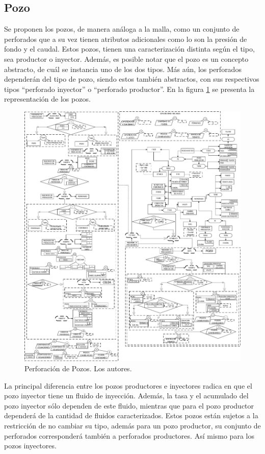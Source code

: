 \subsection{Pozo}\label{sec:PS_Well}
Se proponen los pozos, de manera análoga a la malla, como un conjunto de perforados que a su vez tienen atributos adicionales como lo son la presión de fondo y el caudal. Estos pozos, tienen una caracterización distinta según el tipo, sea productor o inyector. Además, es posible notar que el pozo es un concepto abstracto, de cuál se instancia uno de los dos tipos. Más aún, los perforados dependerán del tipo de pozo, siendo estos también abstractos, con sus respectivos tipos ``perforado inyector'' o ``perforado productor''. En la figura \ref{fig:Well} se presenta la representación de los pozos.\\

\begin{figure}[h]
	\centering%
	\includegraphics[width=0.9\linewidth]{Fig/Pozo.pdf}%
	\caption[Perforación de Pozos.]{Perforación de Pozos. Los autores.} \label{fig:Well}
\end{figure}

La principal diferencia entre los pozos productores e inyectores radica en que el pozo inyector tiene un fluido de inyección. Además, la tasa y el acumulado del pozo inyector sólo dependen de este fluido, mientras que para el pozo productor dependerá de la cantidad de fluidos caracterizados. Estos pozos están sujetos a la restricción de no cambiar su tipo, además para un pozo productor, su conjunto de perforados corresponderá también a perforados productores. Así mismo para los pozos inyectores.\\

